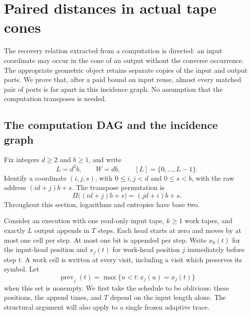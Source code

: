 \section{Paired distances in actual tape cones}\label{sec:nb-section}

The recovery relation extracted from a computation is directed: an input
coordinate may occur in the cone of an output without the converse
occurrence.  The appropriate geometric object retains separate copies of
the input and output ports.  We prove that, after a paid bound on input
reuse, almost every matched pair of ports is far apart in this incidence
graph.  No assumption that the computation transposes is needed.

\subsection{The computation DAG and the incidence graph}

Fix integers $d\ge2$ and $b\ge1$, and write
\[
 L=d^2b,\qquad W=db,\qquad [L]=\{0,\ldots,L-1\}.
\]
Identify a coordinate $(i,j,s)$, with $0\le i,j<d$ and $0\le s<b$, with
the raw address $(id+j)b+s$.  The transpose permutation is
\begin{equation}\label{eq:nb-transpose}
 \Pi\bigl((id+j)b+s\bigr)=(jd+i)b+s.
\end{equation}
Throughout this section, logarithms and entropies have base two.

Consider an execution with one read-only input tape, $k\ge1$ work tapes,
and exactly $L$ output appends in $T$ steps.  Each head starts at zero and
moves by at most one cell per step.  At most one bit is appended per step.
Write $x_0(t)$ for the input-head position and $x_j(t)$ for work-head
position $j$ immediately before step $t$.  A work cell is written at every
visit, including a visit which preserves its symbol.  Let
\[
 \operatorname{prev}_j(t)=\max\{u<t:x_j(u)=x_j(t)\}
\]
when this set is nonempty.  We first take the schedule to be oblivious:
these positions, the append times, and $T$ depend on the input length
alone.  The structural argument will also apply to a single frozen
adaptive trace.

